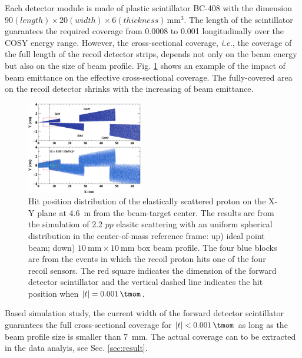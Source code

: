 \documentclass[number,5p]{elsarticle}
\begin{document}
Each detector module is made of plastic scintillator BC-408 \cite{bc408} with the dimension $90 (length) \times 20 (width) \times 6
(thickness)\,\si{\mm\tothe{3}}$.
The length of the scintillator guarantees the required coverage
from \SI{0.0008}{\tmom} to \SI{0.001}{\tmom} longitudinally over the COSY energy range.
However, the cross-sectional coverage, \textit{i.e.}, the coverage of the full length of
the recoil detector strips, depends not only on the beam energy but also on the
size of beam profile.
Fig. \ref{fig:forward_acceptance} shows an example of the impact of beam emittance on the
effective cross-sectional coverage.
The fully-covered area on the recoil detector shrinks with the increasing of beam emittance. 
\begin{figure}[htbp]
  \centering
  \includegraphics[width=0.45\textwidth]{./fwd_acceptance.png}
  \caption{
    Hit position distribution of the elastically scattered proton on the X-Y plane at \SI{4.6}{\meter}
    from the beam-target center. The results are from the simulation of \SI{2.2}{\momentum}
    $pp$ elasitc scattering with an uniform spherical distribution in the
    center-of-mass reference frame: up) ideal point beam; down) $\SI{10}{\mm}\times\SI{10}{\mm}$ box beam profile.
    The four blue blocks are from the events in which the recoil proton hits one of
    the four recoil sensors.
    The red square indicates the dimension of the forward detector scintillator
    and the vertical dashed line indicates the hit position when $|t| = \SI{0.001}{\tmom}$.}
  \label{fig:forward_acceptance}
\end{figure}
Based simulation study, the current width of the forward detector scintillator guarantees the
full cross-sectional coverage for $|t| < \SI{0.001}{\tmom}$ as long as the beam profile size is smaller than \SI{7}{\mm}.
The actual coverage can to be extracted in the data analyis, see Sec. \ref{sec:result}.
\end{document}
